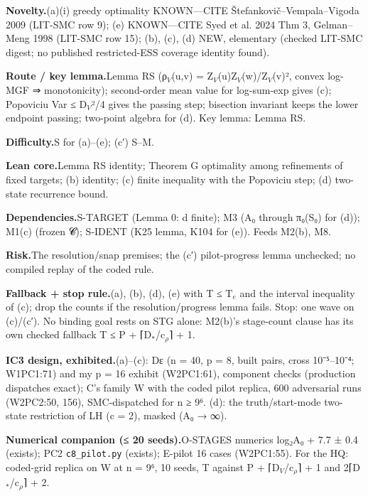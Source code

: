 {\par\smallskip\noindent\textbf{Novelty.}\enspace (a)(i) greedy optimality KNOWN—CITE Štefankovič–Vempala–Vigoda 2009 (LIT-SMC row 9); (e) KNOWN—CITE Syed et al. 2024 Thm 3, Gelman–Meng 1998 (LIT-SMC row 15); (b), (c), (d) NEW, elementary (checked LIT-SMC digest; no published restricted-ESS coverage identity found).
\par\smallskip\noindent\textbf{Route / key lemma.}\enspace Lemma RS (ρ$_{V}$(u,v) = Z$_{V}$(u)Z$_{V}$(w)/Z$_{V}$(v)², convex log-MGF ⇒ monotonicity); second-order mean value for log-sum-exp gives (c); Popoviciu Var ≤ D$_{V}$²/4 gives the passing step; bisection invariant keeps the lower endpoint passing; two-point algebra for (d). Key lemma: Lemma RS.
\par\smallskip\noindent\textbf{Difficulty.}\enspace S for (a)–(e); (c′) S–M.
\par\smallskip\noindent\textbf{Lean core.}\enspace Lemma RS identity; Theorem G optimality among refinements of fixed targets; (b) identity; (c) finite inequality with the Popoviciu step; (d) two-state recurrence bound.
\par\smallskip\noindent\textbf{Dependencies.}\enspace S-TARGET (Lemma 0: d finite); M3 (A₀ through π₀(S₀) for (d)); M1(c) (frozen 𝓒); S-IDENT (K25 lemma, K104 for (e)). Feeds M2(b), M8.
\par\smallskip\noindent\textbf{Risk.}\enspace The resolution/snap premises; the (c′) pilot-progress lemma unchecked; no compiled replay of the coded rule.
\par\smallskip\noindent\textbf{Fallback + stop rule.}\enspace (a), (b), (d), (e) with T ≤ T$_{e}$ and the interval inequality of (c); drop the counts if the resolution/progress lemma fails. Stop: one wave on (c)/(c′). No binding goal rests on STG alone: M2(b)'s stage-count clause has its own checked fallback T ≤ P + ⌈D$_{*}$/c$_{ρ}$⌉ + 1.
\par\smallskip\noindent\textbf{IC3 design, exhibited.}\enspace (a)–(c): Dε (n = 40, p = 8, built pairs, cross 10⁻⁵–10⁻⁴; W1PC1:71) and my p = 16 exhibit (W2PC1:61), component checks (production dispatches exact); C's family W with the coded pilot replica, 600 adversarial runs (W2PC2:50, 156), SMC-dispatched for n ≥ 9⁶. (d): the truth/start-mode two-state restriction of LH (c = 2), masked (A₀ → ∞).
\par\smallskip\noindent\textbf{Numerical companion (≤ 20 seeds).}\enspace O-STAGES numerics log₂A₀ + 7.7 ± 0.4 (exists); PC2 \texttt{c8\_pilot.py} (exists); E-pilot 16 cases (W2PC1:55). For the HQ: coded-grid replica on W at n = 9⁶, 10 seeds, T against P + ⌈D$_{V}$/c$_{ρ}$⌉ + 1 and 2⌈D$_{*}$/c$_{ρ}$⌉ + 2.
}

